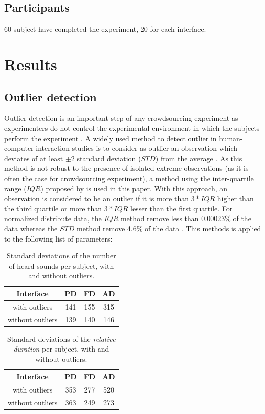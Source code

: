 \documentclass{aes2e}
\begin{document}
\subsection{Participants}
60 subject have completed the experiment, 20 for each interface.
\section{Results}
\subsection{Outlier detection}
Outlier detection is an important step of any crowdsourcing experiment as experimenters do not control the experimental environment in which the subjects perform the experiment \cite{komarov2013crowdsourcing}\cite{buchholz2011crowdsourcing}. A widely used method to detect outlier in  human-computer interaction studies is to consider as outlier an observation  which deviates of at least $\pm2$ standard deviation ($STD$) from the average \cite{komarov2013crowdsourcing}. As this method is not robust to the presence of isolated extreme observations (as it is often the case for crowdsourcing experiment), a method using the inter-quartile range ($IQR$) proposed by \cite{komarov2013crowdsourcing} is used in this paper. With this approach, an observation is considered to be an outlier if it is more than $3*IQR$ higher than the third quartile or more than $3*IQR$ lesser than the first quartile. For normalized distribute data, the $IQR$ method remove less than 0.00023\% of the data whereas the  $STD$ method remove 4.6\% of the data \cite{komarov2013crowdsourcing}. This methods is applied to the following list of parameters:

 \begin{table}[t]
\caption{\label{tab1} Standard deviations of the number of heard sounds per subject, with and without outliers.}
\begin{center}
\begin{tabular}{cccc}
Interface &  PD &  FD& AD \\
\hline
with outliers & 141 & 155 & 315 \\
without outliers & 139 & 140 & 146 \\  
\hline
\end{tabular}
\end{center}
\end{table} 
\begin{table}[t]
\caption{\label{tab2} Standard deviations of the \textit{relative duration} per subject, with and without outliers.}
\begin{center}
\begin{tabular}{cccc}
Interface &  PD &  FD &  AD \\
\hline
with outliers & 353 & 277 & 520 \\
without outliers & 363 & 249 & 273 \\  
\hline
\end{tabular}
\end{center}
\end{table} 
\end{document}
